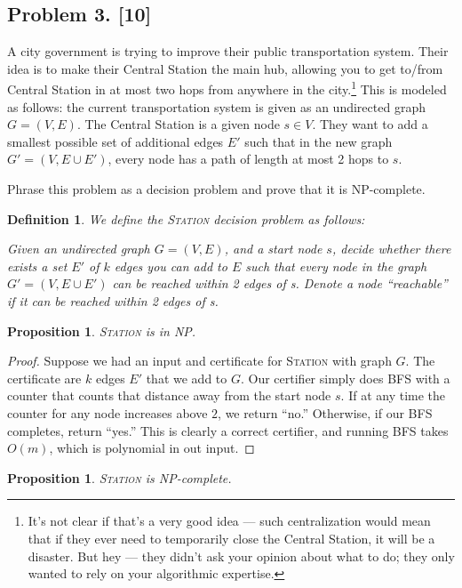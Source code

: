 \documentclass[10pt]{article}
\newtheorem{proposition}[lemma]{Proposition}
\newtheorem{definition}{Definition}
\begin{document}
\subsection*{Problem 3. [10]}
  A city government is trying to improve their public transportation system. Their idea is to make their Central Station the main hub, allowing you to get to/from Central Station in at most two hops from anywhere in the city.\footnote{It's not clear if that's a very good idea --- such centralization would mean that if they ever need to temporarily close the Central Station, it will be a disaster. But hey --- they didn't ask your opinion about what to do; they only wanted to rely on your algorithmic expertise.}
  This is modeled as follows: the current transportation system is given as an undirected graph $G=(V,E)$. The Central Station is a given node $s \in V$. They want to add a smallest possible set of additional edges $E'$ such that in the new graph $G'=(V,E \cup E')$, every node has a path of length at most 2 hops to $s$.

  Phrase this problem as a decision problem and prove that it is NP-complete.

\begin{definition}
  We define the \textsc{Station} decision problem as follows:

  Given an undirected graph \(G = (V, E)\), and a start node \(s\), decide whether there exists a set \(E'\) of \(k\) edges you can add to \(E\) such that every node in the graph \(G' = (V, E \cup E')\) can be reached within 2 edges of s. Denote a node ``reachable'' if it can be reached within 2 edges of s.
\end{definition}

\begin{proposition}
  \textsc{Station} is in NP.
\end{proposition}

\begin{proof}
  Suppose we had an input and certificate for \textsc{Station} with graph \(G\). The certificate are \(k\) edges \(E'\) that we add to \(G\). Our certifier simply does BFS with a counter that counts that distance away from the start node \(s\). If at any time the counter for any node increases above \(2\), we return ``no.'' Otherwise, if our BFS completes, return ``yes.'' This is clearly a correct certifier, and running BFS takes \(O(m)\), which is polynomial in out input.
\end{proof}

\begin{proposition}
  \textsc{Station} is NP-complete.
\end{proposition}
\end{document}
